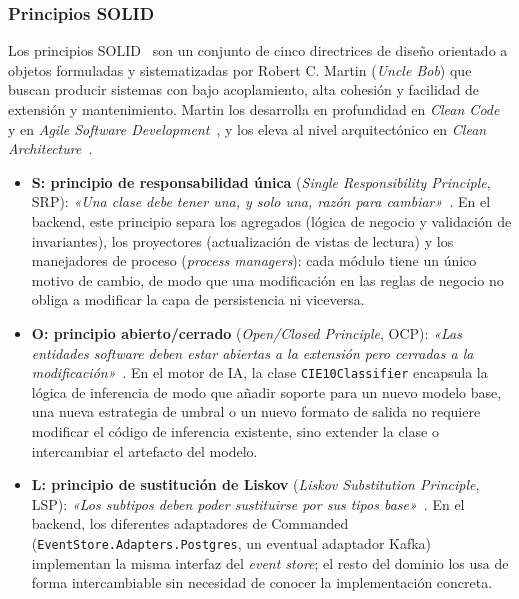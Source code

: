 \subsubsection{Principios SOLID}

Los principios SOLID~\cite{MartinCleanCode08,MartinPPP02} son un conjunto de cinco directrices de diseño orientado a objetos formuladas y sistematizadas por Robert C. Martin (\emph{Uncle Bob}) que buscan producir sistemas con bajo acoplamiento, alta cohesión y facilidad de extensión y mantenimiento. Martin los desarrolla en profundidad en \emph{Clean Code}~\cite{MartinCleanCode08} y en \emph{Agile Software Development}~\cite{MartinPPP02}, y los eleva al nivel arquitectónico en \emph{Clean Architecture}~\cite{MartinCleanArch17}.

\begin{itemize}
 \item \textbf{S: principio de responsabilidad única} (\emph{Single Responsibility Principle}, SRP): \emph{«Una clase debe tener una, y solo una, razón para cambiar»}~\cite{MartinPPP02}. En el backend, este principio separa los agregados (lógica de negocio y validación de invariantes), los proyectores (actualización de vistas de lectura) y los manejadores de proceso (\emph{process managers}): cada módulo tiene un único motivo de cambio, de modo que una modificación en las reglas de negocio no obliga a modificar la capa de persistencia ni viceversa.

 \item \textbf{O: principio abierto/cerrado} (\emph{Open/Closed Principle}, OCP): \emph{«Las entidades software deben estar abiertas a la extensión pero cerradas a la modificación»}~\cite{MartinPPP02}. En el motor de IA, la clase \texttt{CIE10Classifier} encapsula la lógica de inferencia de modo que añadir soporte para un nuevo modelo base, una nueva estrategia de umbral o un nuevo formato de salida no requiere modificar el código de inferencia existente, sino extender la clase o intercambiar el artefacto del modelo.

 \item \textbf{L: principio de sustitución de Liskov} (\emph{Liskov Substitution Principle}, LSP): \emph{«Los subtipos deben poder sustituirse por sus tipos base»}~\cite{Liskov87,MartinPPP02}. En el backend, los diferentes adaptadores de Commanded (\texttt{EventStore.Adapters.Postgres}, un eventual adaptador Kafka) implementan la misma interfaz del \emph{event store}; el resto del dominio los usa de forma intercambiable sin necesidad de conocer la implementación concreta.


\end{itemize}
